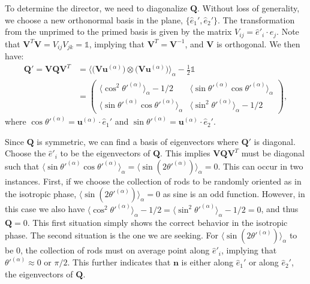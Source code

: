 To determine the director, we need to diagonalize $\mathbf{Q}$.
Without loss of generality, we choose a new orthonormal basis in the plane, $\{ \hat{e}_1', \hat{e}_2' \}$.
The transformation from the unprimed to the primed basis is given by the matrix $V_{ij} = \hat{e}'_i \cdot \hat{e}_j$.
Note that $\mathbf{V}^T \mathbf{V} = V_{ij}V_{jk} =  \mathbb{1}$, implying that $\mathbf{V}^T = \mathbf{V}^{-1}$, and $\mathbf{V}$ is orthogonal.
We then have:
\begin{align}
  \mathbf{Q}' = \mathbf{V} \mathbf{Q} \mathbf{V}^T &=
  \bigg \langle \big ( \mathbf{V} \mathbf{u}^{(\alpha)} \big ) \otimes \big ( \mathbf{V} \mathbf{u}^{(\alpha)} \big )\bigg \rangle_{\alpha}  - \frac{1}{2} \mathbb{1} \nonumber \\ & =
  \begin{pmatrix}
    \langle \cos^2 \theta'^{(\alpha)}\rangle_{\alpha} - 1/2 & \langle \sin \theta'^{(\alpha)} \cos \theta'^{(\alpha)} \rangle_{\alpha} \\
    \langle \sin \theta'^{(\alpha)} \cos \theta'^{(\alpha)} \rangle_{\alpha} & \langle \sin^2 \theta'^{(\alpha)} \rangle_{\alpha} - 1/2
  \end{pmatrix},\label{e:2-2DOrderRot}
\end{align}
where $\cos \theta'^{(\alpha)} = \mathbf{u}^{(\alpha)} \cdot \hat{e}_1'$ and $\sin \theta'^{(\alpha)} = \mathbf{u}^{(\alpha)} \cdot \hat{e}_2'$.

Since $\mathbf{Q}$ is symmetric, we can find a basis of eigenvectors where $\mathbf{Q}'$ is diagonal.
Choose the $\hat{e}'_i$ to be the eigenvectors of $\mathbf{Q}$.
This implies $ \mathbf{V} \mathbf{Q} \mathbf{V}^T$ must be diagonal such that $\langle \sin \theta'^{(\alpha)} \cos \theta'^{(\alpha)} \rangle_{\alpha} = \langle \sin (2 \theta'^{(\alpha)}) \rangle_{\alpha} = 0$.
This can occur in two instances.
First, if we choose the collection of rods to be randomly oriented as in the isotropic phase, $\langle \sin (2 \theta'^{(\alpha)}) \rangle_{\alpha} = 0$ as sine is an odd function.
However, in this case we also have $\langle \cos^2 \theta'^{(\alpha)}\rangle_{\alpha} - 1/2 = \langle \sin^2 \theta'^{(\alpha)}\rangle_{\alpha} - 1/2 = 0$, and thus $\mathbf{Q} = 0$.
This first situation simply shows the correct behavior in the isotropic phase.
The second situation is the one we are seeking.
For $\langle \sin (2 \theta'^{(\alpha)}) \rangle_{\alpha}$ to be $0$, the collection of rods must on average point along $\hat{e}'_i$, implying that $\theta'^{(\alpha)} \approx 0 \textrm{ or } \pi/2$.
This further indicates that $\mathbf{n}$ is either along $\hat{e}_1'$ or along $\hat{e}_2'$, the eigenvectors of $\mathbf{Q}$.

